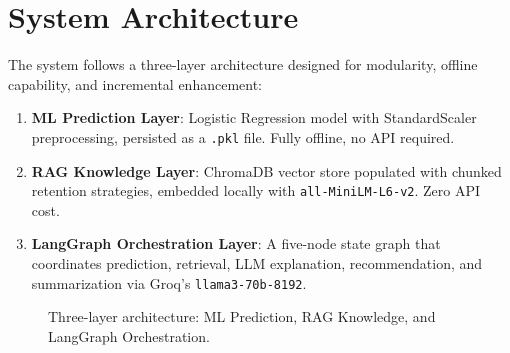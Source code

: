 \section{System Architecture}

The system follows a three-layer architecture designed for modularity, offline capability,
and incremental enhancement:

\begin{enumerate}[leftmargin=*]
    \item \textbf{ML Prediction Layer}: Logistic Regression model with StandardScaler
        preprocessing, persisted as a \texttt{.pkl} file. Fully offline, no API required.
    \item \textbf{RAG Knowledge Layer}: ChromaDB vector store populated with chunked
        retention strategies, embedded locally with \texttt{all-MiniLM-L6-v2}. Zero API cost.
    \item \textbf{LangGraph Orchestration Layer}: A five-node state graph that coordinates
        prediction, retrieval, LLM explanation, recommendation, and summarization via
        Groq's \texttt{llama3-70b-8192}.
\end{enumerate}

\begin{figure}[h]
\centering
{}
\caption{Three-layer architecture: ML Prediction, RAG Knowledge, and LangGraph Orchestration.}
\end{figure}

